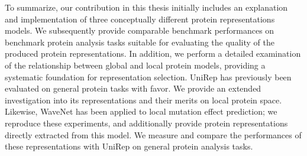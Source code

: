 
To summarize, our contribution in this thesis initially includes an explanation and implementation of three conceptually different protein representations models. We subsequently provide comparable benchmark performances on benchmark protein analysis tasks suitable for evaluating the quality of the produced protein representations. In addition, we perform a detailed examination of the relationship between global and local protein models, providing a systematic foundation for representation selection. UniRep has previously been evaluated on general protein tasks with favor. We provide an extended investigation into its representations and their merits on local protein space. Likewise, WaveNet has been applied to local mutation effect prediction; we reproduce these experiments, and additionally provide protein representations directly extracted from this model. We measure and compare the performances of these representations with UniRep on general protein analysis tasks.

